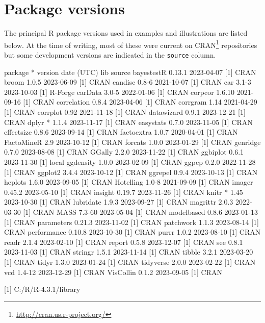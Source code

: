 \documentclass[
  letterpaper,
  10pt,
  krantz2]{krantz}
\providecommand{\href}[2]{#2\footnote{\url{#1}}}
\begin{document}
\hypertarget{package-versions}{%
\section*{Package versions}\label{package-versions}}


The principal R package versions used in examples and illustrations are
listed below. At the time of writing, most of these were current on
\href{http://cran.us.r-project.org/}{CRAN} repositories but some
development versions are indicated in the \texttt{source} column.

package * version date (UTC) lib source bayestestR 0.13.1 2023-04-07
{[}1{]} CRAN broom 1.0.5 2023-06-09 {[}1{]} CRAN candisc 0.8-6
2021-10-07 {[}1{]} CRAN car 3.1-3 2023-10-03 {[}1{]} R-Forge carData
3.0-5 2022-01-06 {[}1{]} CRAN corpcor 1.6.10 2021-09-16 {[}1{]} CRAN
correlation 0.8.4 2023-04-06 {[}1{]} CRAN corrgram 1.14 2021-04-29
{[}1{]} CRAN corrplot 0.92 2021-11-18 {[}1{]} CRAN datawizard 0.9.1
2023-12-21 {[}1{]} CRAN dplyr * 1.1.4 2023-11-17 {[}1{]} CRAN easystats
0.7.0 2023-11-05 {[}1{]} CRAN effectsize 0.8.6 2023-09-14 {[}1{]} CRAN
factoextra 1.0.7 2020-04-01 {[}1{]} CRAN FactoMineR 2.9 2023-10-12
{[}1{]} CRAN forcats 1.0.0 2023-01-29 {[}1{]} CRAN genridge 0.7.0
2023-08-08 {[}1{]} CRAN GGally 2.2.0 2023-11-22 {[}1{]} CRAN ggbiplot
0.6.1 2023-11-30 {[}1{]} local ggdensity 1.0.0 2023-02-09 {[}1{]} CRAN
ggpcp 0.2.0 2022-11-28 {[}1{]} CRAN ggplot2 3.4.4 2023-10-12 {[}1{]}
CRAN ggrepel 0.9.4 2023-10-13 {[}1{]} CRAN heplots 1.6.0 2023-09-05
{[}1{]} CRAN Hotelling 1.0-8 2021-09-09 {[}1{]} CRAN imager 0.45.2
2023-05-10 {[}1{]} CRAN insight 0.19.7 2023-11-26 {[}1{]} CRAN knitr *
1.45 2023-10-30 {[}1{]} CRAN lubridate 1.9.3 2023-09-27 {[}1{]} CRAN
magrittr 2.0.3 2022-03-30 {[}1{]} CRAN MASS 7.3-60 2023-05-04 {[}1{]}
CRAN modelbased 0.8.6 2023-01-13 {[}1{]} CRAN parameters 0.21.3
2023-11-02 {[}1{]} CRAN patchwork 1.1.3 2023-08-14 {[}1{]} CRAN
performance 0.10.8 2023-10-30 {[}1{]} CRAN purrr 1.0.2 2023-08-10
{[}1{]} CRAN readr 2.1.4 2023-02-10 {[}1{]} CRAN report 0.5.8 2023-12-07
{[}1{]} CRAN see 0.8.1 2023-11-03 {[}1{]} CRAN stringr 1.5.1 2023-11-14
{[}1{]} CRAN tibble 3.2.1 2023-03-20 {[}1{]} CRAN tidyr 1.3.0 2023-01-24
{[}1{]} CRAN tidyverse 2.0.0 2023-02-22 {[}1{]} CRAN vcd 1.4-12
2023-12-29 {[}1{]} CRAN VisCollin 0.1.2 2023-09-05 {[}1{]} CRAN

{[}1{]} C:/R/R-4.3.1/library



\backmatter
\printindex
\end{document}
